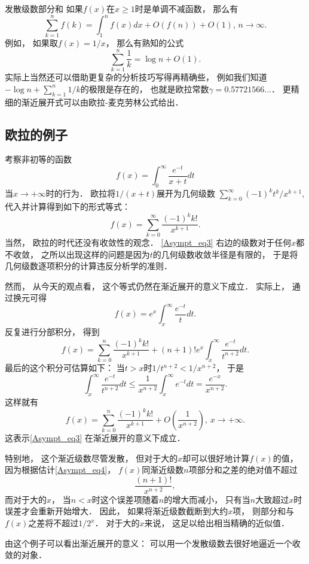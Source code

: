 \begin{example}{发散级数部分和}
如果$f(x)$在$x\geq1$时是单调不减函数， 那么有$$
\sum_{k=1}^nf(k)=\int_1^n f(x)dx+O(f(n))+O(1),\,n\to\infty.
$$
例如， 如果取$f(x)=1/x$， 那么有熟知的公式
$$
\sum_{k=1}^n\frac{1}{k}=\log n+O(1).
$$
实际上当然还可以借助更复杂的分析技巧写得再精确些， 例如我们知道$-\log n+\sum_{k=1}^n1/k$的极限是存在的， 也就是欧拉常数$\gamma=0.57721566...$． 更精细的渐近展开式可以由欧拉-麦克劳林公式给出．
\end{example}

\subsection{欧拉的例子}
考察非初等的函数
$$
f(x)=\int_0^\infty\frac{e^{-t}}{x+t}dt
$$
当$x\to+\infty$时的行为． 欧拉将$1/(x+t)$展开为几何级数
$
\sum_{k=0}^\infty {(-1)^kt^k}/{x^{k+1}},
$
代入并计算得到如下的形式等式：
\begin{equation}\label{Asympt_eq3}
f(x)=\sum_{k=0}^\infty\frac{(-1)^kk!}{x^{k+1}}.
\end{equation}
当然， 欧拉的时代还没有收敛性的观念． \autoref{Asympt_eq3} 右边的级数对于任何$x$都不收敛， 之所以出现这样的问题是因为$t$的几何级数收敛半径是有限的， 于是将几何级数逐项积分的计算违反分析学的准则． 

然而， 从今天的观点看， 这个等式仍然在渐近展开的意义下成立． 实际上， 通过换元可得
$$
f(x)=e^{x}\int_x^\infty \frac{e^{-t}}{t}dt.
$$
反复进行分部积分， 得到
$$
f(x)=\sum_{k=0}^n\frac{(-1)^kk!}{x^{k+1}}
+(n+1)!e^x\int_x^\infty\frac{e^{-t}}{t^{n+2}}dt.
$$
最后的这个积分可估算如下： 当$t>x$时$1/t^{n+2}<1/x^{n+2}$， 于是
\begin{equation}\label{Asympt_eq4}
\int_x^\infty\frac{e^{-t}}{t^{n+2}}dt
\leq\frac{1}{x^{n+2}}\int_x^\infty e^{-t}dt
=\frac{e^{-x}}{x^{n+2}}.
\end{equation}
这样就有
$$
f(x)=\sum_{k=0}^n\frac{(-1)^kk!}{x^{k+1}}
+O\left(\frac{1}{x^{n+2}}\right),\,x\to+\infty.
$$
这表示\autoref{Asympt_eq3} 在渐近展开的意义下成立． 

特别地， 这个渐近级数尽管发散， 但对于大的$x$却可以很好地计算$f(x)$的值， 因为根据估计\autoref{Asympt_eq4}， $f(x)$同渐近级数$n$项部分和之差的绝对值不超过
$$
\frac{(n+1)!}{x^{n+2}},
$$
而对于大的$x$， 当$n<x$时这个误差项随着$n$的增大而减小， 只有当$n$大致超过$x$时误差才会重新开始增大． 因此， 如果将渐近级数截断到大约$x$项， 则部分和与$f(x)$之差将不超过$1/2^x$． 对于大的$x$来说， 这足以给出相当精确的近似值． 

由这个例子可以看出渐近展开的意义： 可以用一个发散级数去很好地逼近一个收敛的对象．
